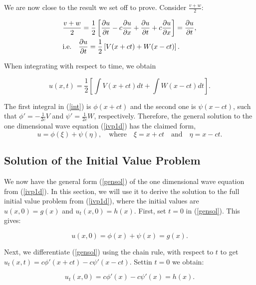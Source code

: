 \documentclass[a4paper, 12pt]{article}
\numberwithin{equation}{section}
\begin{document}
We are now close to the result we set off to prove. Consider $\frac{v+w}{2}$:

\begin{equation*}
    \begin{aligned}
    &\frac{v+w}{2}=\frac{1}{2}\left[\diffp[1]{u}{t}-c\diffp[1]{u}{x}+\diffp[1]{u}{t}+c\diffp[1]{u}{x}\right]=\diffp[1]{u}{t},\\
    &\textrm{i.e.} \quad \diffp[1]{u}{t}=\frac{1}{2}\left[V(x+ct)+W(x-ct)\right].
    \end{aligned}
\end{equation*}

When integrating with respect to time, we obtain

\begin{equation} \label{int}
    u(x,t)=\frac{1}{2}\left[\int{V(x+ct)dt}+\int{W(x-ct)dt}\right].
\end{equation}

The first integral in (\ref{int}) is $\phi(x+ct)$ and the second one is $\psi(x-ct)$, such that $\phi'=-\frac{1}{2c}V$ and $\psi'=\frac{1}{2c}W$, respectively.
Therefore, the general solution to the one dimensional wave equation (\ref{ivp1d}) has the claimed form, 
\begin{equation} \label{gensol}
    u=\phi(\xi)+\psi(\eta), \quad \textrm{where} \quad \xi=x+ct \quad \textrm{and} \quad \eta=x-ct.
\end{equation}

\subsection{Solution of the Initial Value Problem}
We now have the general form (\ref{gensol}) of the one dimensional wave equation from (\ref{ivp1d}). In this section, we will use it to derive the solution to
the full initial value problem from (\ref{ivp1d}), where the initial values are $u(x,0)=g(x)$ and $u_t(x,0)=h(x)$. First, set $t=0$ in (\ref{gensol}). This gives:

\begin{equation} \label{t=0}
    u(x,0)=\phi(x)+\psi(x)=g(x).
\end{equation}

Next, we differentiate (\ref{gensol}) using the chain rule, with respect to $t$ to get $u_t(x,t)=c\phi'(x+ct)-c\psi'(x-ct)$. Settin $t=0$ we obtain:

\begin{equation} \label{ut=0}
    u_t(x,0)=c\phi'(x)-c\psi'(x)=h(x).
\end{equation}
\end{document}
